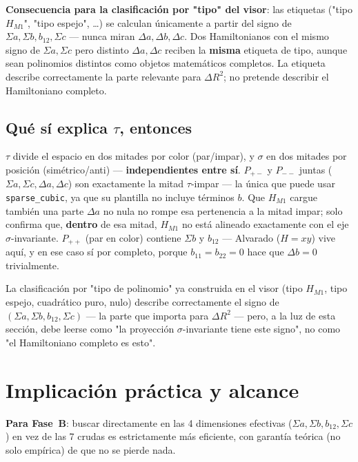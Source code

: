\documentclass[11pt, a4paper]{article}
\begin{document}
\textbf{Consecuencia para la clasificaci\'on por "tipo" del visor}: las
etiquetas ("tipo $H_{M1}$", "tipo espejo", \ldots) se calculan
\'unicamente a partir del signo de $\Sigma a,\Sigma b,b_{12},\Sigma c$
--- nunca miran $\Delta a,\Delta b,\Delta c$. Dos Hamiltonianos con el
mismo signo de $\Sigma a,\Sigma c$ pero distinto $\Delta a,\Delta c$
reciben la \textbf{misma} etiqueta de tipo, aunque sean polinomios
distintos como objetos matem\'aticos completos. La etiqueta describe
correctamente la parte relevante para $\Delta R^2$; no pretende
describir el Hamiltoniano completo.

\subsection{Qu\'e s\'i explica $\tau$, entonces}

$\tau$ divide el espacio en dos mitades por color (par/impar), y
$\sigma$ en dos mitades por posici\'on (sim\'etrico/anti) ---
\textbf{independientes entre s\'i}. $P_{+-}$ y $P_{--}$ juntas
($\Sigma a,\Sigma c,\Delta a,\Delta c$) son exactamente la mitad
$\tau$-impar --- la \'unica que puede usar \texttt{sparse\_cubic}, ya
que su plantilla no incluye t\'erminos $b$. Que $H_{M1}$ cargue
tambi\'en una parte $\Delta a$ no nula no rompe esa pertenencia a la
mitad impar; solo confirma que, \textbf{dentro} de esa mitad, $H_{M1}$
no est\'a alineado exactamente con el eje $\sigma$-invariante. $P_{++}$
(par en color) contiene $\Sigma b$ y $b_{12}$ --- Alvarado ($H=xy$)
vive aqu\'i, y en ese caso s\'i por completo, porque $b_{11}=b_{22}=0$
hace que $\Delta b=0$ trivialmente.

La clasificaci\'on por "tipo de polinomio" ya construida en el visor
(tipo $H_{M1}$, tipo espejo, cuadr\'atico puro, nulo) describe
correctamente el signo de $(\Sigma a,\Sigma b,b_{12},\Sigma c)$ ---
la parte que importa para $\Delta R^2$ --- pero, a la luz de esta
secci\'on, debe leerse como "la proyecci\'on $\sigma$-invariante tiene
este signo", no como "el Hamiltoniano completo es esto".

\section{Implicaci\'on pr\'actica y alcance}

\textbf{Para Fase~B}: buscar directamente en las 4 dimensiones
efectivas ($\Sigma a,\Sigma b,b_{12},\Sigma c$) en vez de las 7 crudas
es estrictamente m\'as eficiente, con garant\'ia te\'orica (no solo
emp\'irica) de que no se pierde nada.
\end{document}
